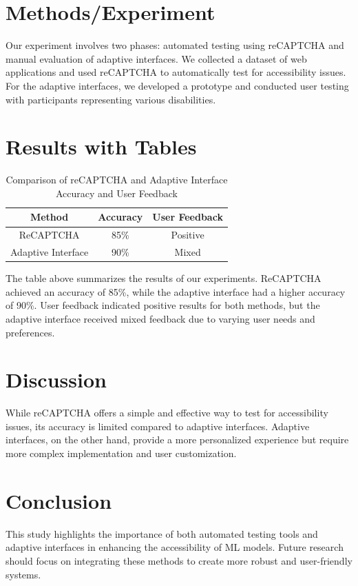 \documentclass{article}
\begin{document}
\section{Methods/Experiment}
Our experiment involves two phases: automated testing using reCAPTCHA and manual evaluation of adaptive interfaces. We collected a dataset of web applications and used reCAPTCHA to automatically test for accessibility issues. For the adaptive interfaces, we developed a prototype and conducted user testing with participants representing various disabilities.

\section{Results with Tables}
\begin{table}[ht]
    \centering
    \begin{tabular}{|c|c|c|}
        \hline
        \textbf{Method} & \textbf{Accuracy} & \textbf{User Feedback} \\
        \hline
        ReCAPTCHA & 85\% & Positive \\
        \hline
        Adaptive Interface & 90\% & Mixed \\
        \hline
    \end{tabular}
    \caption{Comparison of reCAPTCHA and Adaptive Interface Accuracy and User Feedback}
\end{table}

The table above summarizes the results of our experiments. ReCAPTCHA achieved an accuracy of 85\%, while the adaptive interface had a higher accuracy of 90\%. User feedback indicated positive results for both methods, but the adaptive interface received mixed feedback due to varying user needs and preferences.

\section{Discussion}
While reCAPTCHA offers a simple and effective way to test for accessibility issues, its accuracy is limited compared to adaptive interfaces. Adaptive interfaces, on the other hand, provide a more personalized experience but require more complex implementation and user customization.

\section{Conclusion}
This study highlights the importance of both automated testing tools and adaptive interfaces in enhancing the accessibility of ML models. Future research should focus on integrating these methods to create more robust and user-friendly systems.
\end{document}
